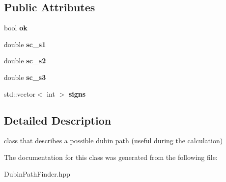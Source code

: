 \subsection*{Public Attributes}
\begin{DoxyCompactItemize}
\item 
\mbox{\label{class_path2_d_1_1_dubin_path_finder_1_1_possible_dubin_path_a6bd805f15b8e66169bd7c74edf4a8566}} 
bool {\bfseries ok}
\item 
\mbox{\label{class_path2_d_1_1_dubin_path_finder_1_1_possible_dubin_path_a9c07bd6e2b9a01be56bd1a23b5c4e279}} 
double {\bfseries sc\+\_\+s1}
\item 
\mbox{\label{class_path2_d_1_1_dubin_path_finder_1_1_possible_dubin_path_a57c4d024385e0afa38b090667d42e151}} 
double {\bfseries sc\+\_\+s2}
\item 
\mbox{\label{class_path2_d_1_1_dubin_path_finder_1_1_possible_dubin_path_a58a4eff149cbfff0af87ba29cc5440d3}} 
double {\bfseries sc\+\_\+s3}
\item 
\mbox{\label{class_path2_d_1_1_dubin_path_finder_1_1_possible_dubin_path_a61c0e5502f74979e777d1d869a2edd9f}} 
std\+::vector$<$ int $>$ {\bfseries signs}
\end{DoxyCompactItemize}


\subsection{Detailed Description}
class that describes a possible dubin path (useful during the calculation) 

The documentation for this class was generated from the following file\+:\begin{DoxyCompactItemize}
\item 
Dubin\+Path\+Finder.\+hpp\end{DoxyCompactItemize}
